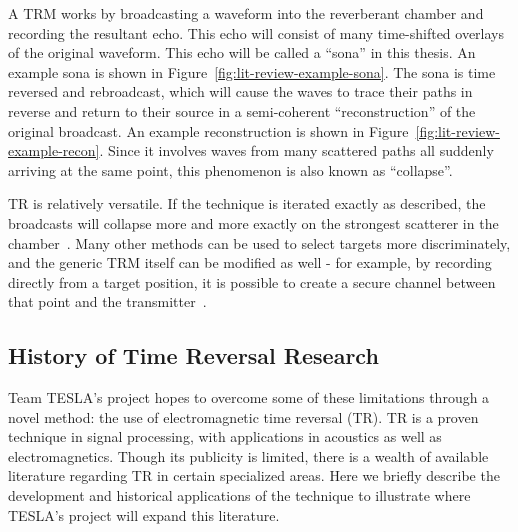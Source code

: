 A TRM works by broadcasting a waveform into the reverberant chamber and recording the resultant echo. This echo will consist of many time-shifted overlays of the original waveform. This echo will be called a ``sona'' in this thesis. An example sona is shown in Figure~\ref{fig:lit-review-example-sona}. The sona is time reversed and rebroadcast, which will cause the waves to trace their paths in reverse and return to their source in a semi-coherent ``reconstruction'' of the original broadcast. An example reconstruction is shown in Figure~\ref{fig:lit-review-example-recon}. Since it involves waves from many scattered paths all suddenly arriving at the same point, this phenomenon is also known as ``collapse''.

TR is relatively versatile. If the technique is iterated exactly as described, the broadcasts will collapse more and more exactly on the strongest scatterer in the chamber~\cite{fink_time-reversed_1999}. Many other methods can be used to select targets more discriminately, and the generic TRM itself can be modified as well - for example, by recording directly from a target position, it is possible to create a secure channel between that point and the transmitter~\cite{nltr-wave-chaotic}.

\subsection{History of Time Reversal Research}

Team TESLA's project hopes to overcome some of these limitations through a novel method: the use of electromagnetic time reversal (TR). TR is a proven technique in signal processing, with applications in acoustics as well as electromagnetics. Though its publicity is limited, there is a wealth of available literature regarding TR in certain specialized areas. Here we briefly describe the development and historical applications of the technique to illustrate where TESLA's project will expand this literature.

